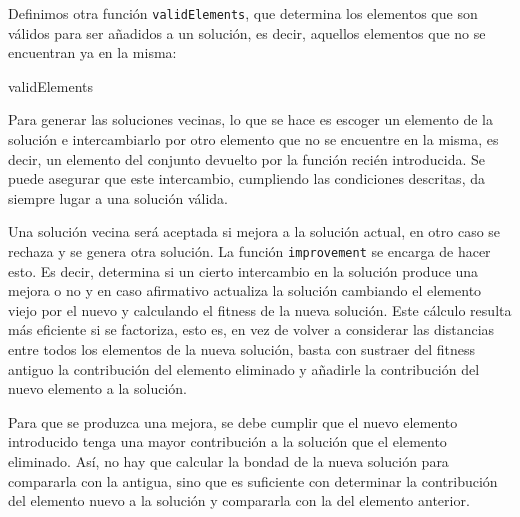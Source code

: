 \documentclass[10pt,a4paper]{article}
\begin{document}
	Definimos otra función \lstinline|validElements|, que determina los elementos que son válidos para ser añadidos a un solución, es decir, aquellos elementos que no se encuentran ya en la misma:
	
	\begin{algorithm}
		\caption{\sc validElements}
	\end{algorithm}

Para generar las soluciones vecinas, lo que se hace es escoger un elemento de la solución e intercambiarlo por otro elemento que no se encuentre en la misma, es decir, un elemento del conjunto devuelto por la función recién introducida. Se puede asegurar que este intercambio, cumpliendo las condiciones descritas, da siempre lugar a una solución válida. 

Una solución vecina será aceptada si mejora a la solución actual, en otro caso se rechaza y se genera otra solución. La función \lstinline|improvement| se encarga de hacer esto. Es decir, determina si un cierto intercambio en la solución produce una mejora o no y en caso afirmativo actualiza la solución cambiando el elemento viejo por el nuevo y calculando el fitness de la nueva solución. Este cálculo resulta más eficiente si se factoriza, esto es, en vez de volver a considerar las distancias entre todos los elementos de la nueva solución, basta con sustraer del fitness antiguo la contribución del elemento eliminado y añadirle la contribución del nuevo elemento a la solución. 

Para que se produzca una mejora, se debe cumplir que el nuevo elemento introducido tenga una mayor contribución a la solución que el elemento eliminado. Así, no hay que calcular la bondad de la nueva solución para compararla con la antigua, sino que es suficiente con determinar la contribución del elemento nuevo a la solución y compararla con la del elemento anterior. 
\end{document}
